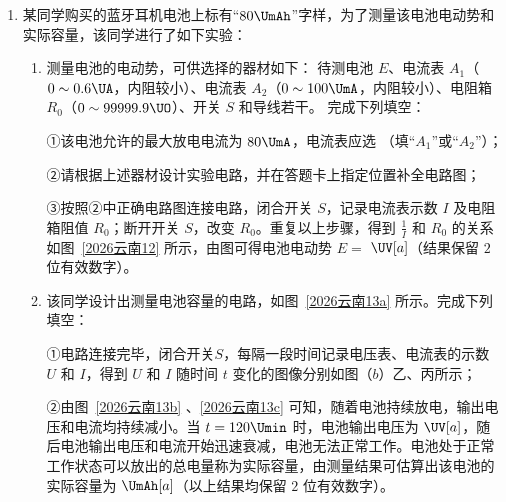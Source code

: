 \documentclass[\gkver]{gaokaozhenti}
\begin{document}
\begin{enumerate}
{\begin{enumerate}
\item
由图可知 $ F_{1} $ 的读数为 $ 6 \times 0.5 \UN=3.0 \UN $

\item
根据平行四边形法则做出合力图像如图所示
由于每小格边长代表 $ 0.5 \UN $，故可得 $ F_{1} $ 和 $ F_{2} $ 的合力大小为 $ F =8 \times 0.5 \UN=4.0 \UN $
\end{enumerate}
}

\item
某同学购买的蓝牙耳机电池上标有“$ 80 \UmAh $”字样，为了测量该电池电动势和实际容量，该同学进行了如下实验：
\begin{enumerate}
	\item 
测量电池的电动势，可供选择的器材如下：
待测电池 $ E $、电流表 $ A _{1} $（$ 0 \sim 0.6 \UA $，内阻较小）、电流表 $ A _{2} $（$ 0 \sim 100 \UmA $，内阻较小）、电阻箱 $ R_{0} $（$ 0 \sim 99999.9 \UO $）、开关 $ S $ 和导线若干。
完成下列填空：

①该电池允许的最大放电电流为 $ 80 \UmA $，电流表应选 （填“$ A _{1} $”或“$ A_{2} $”）；


②请根据上述器材设计实验电路，并在答题卡上指定位置补全电路图；
\onepicture[w=5.27cm]{}


③按照②中正确电路图连接电路，闭合开关 $ S $，记录电流表示数 $ I $ 及电阻箱阻值 $ R_{0} $；断开开关 $ S $，改变 $ R_{0} $。重复以上步骤，得到 $ \frac{1}{I} $ 和 $ R_{0} $ 的关系如图~\ref{2026云南12} 所示，由图可得电池电动势 $ E =$  $\UV[a]$（结果保留 $ 2 $ 位有效数字）。
\onepicture[num=12, showlabel=false, label=2026云南12, w=9.23cm]{}


\item
该同学设计出测量电池容量的电路，如图~\ref{2026云南13a} 所示。完成下列填空：

①电路连接完毕，闭合开关$ S $，每隔一段时间记录电压表、电流表的示数 $ U $ 和 $ I $，得到 $ U $ 和 $ I $ 随时间 $ t $ 变化的图像分别如图（$ b $）乙、丙所示；
\threepicture[labelA=2026云南13a, labelB=2026云南13b, labelC=2026云南13c, hA=2.99cm, hB=3.52cm, hC=3.52cm]
{}{}{}

②由图~\ref{2026云南13b} 、\ref{2026云南13c} 可知，随着电池持续放电，输出电压和电流均持续减小。当 $ t =120 \Umin $ 时，电池输出电压为  $\UV[a]$，随后电池输出电压和电流开始迅速衰减，电池无法正常工作。电池处于正常工作状态可以放出的总电量称为实际容量，由测量结果可估算出该电池的实际容量为  $\UmAh[a]$（以上结果均保留 $ 2 $ 位有效数字）。	
\end{enumerate}




\end{enumerate}
\end{document}
